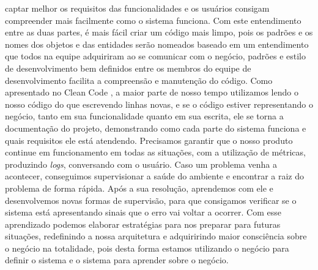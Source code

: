     captar melhor os requisitos das funcionalidades e os usuários consigam
    compreender mais facilmente como o sistema funciona. Com este entendimento
    entre as duas partes, é mais fácil criar um código mais limpo, pois os padrões
    e os nomes dos objetos e das entidades serão nomeados baseado em um entendimento
    que todos na equipe adquiriram ao se comunicar com o negócio, padrões e estilo de
    desenvolvimento bem definidos entre os membros do equipe de desenvolvimento facilita
    a compreensão e manutenção do código. Como apresentado no Clean Code \cite{CleanCode},
    a maior parte de nosso tempo utilizamos lendo o nosso código do que escrevendo
    linhas novas, e se o código estiver representando o negócio, tanto em sua
    funcionalidade quanto em sua escrita, ele se torna a documentação do projeto,
    demonstrando como cada parte do sistema funciona e quais requisitos ele está
    atendendo. \newline
    Precisamos garantir que o nosso produto continue em funcionamento em todas as
    situações, com a utilização de métricas, produzindo \textit{logs}, conversando
    com o usuário. Caso um problema venha a acontecer, conseguimos supervisionar
    a saúde do ambiente e encontrar a raiz do problema de forma rápida. Após a
    sua resolução, aprendemos com ele e desenvolvemos novas formas de supervisão,
    para que consigamos verificar se o sistema está apresentando sinais que o erro
    vai voltar a ocorrer. Com esse aprendizado podemos elaborar estratégias para
    nos preparar para futuras situações, redefinindo a nossa arquitetura e
    adquiririndo maior consciência sobre o negócio na totalidade, pois desta forma
    estamos utilizando o negócio para definir o sistema e o sistema para aprender
    sobre o negócio.
